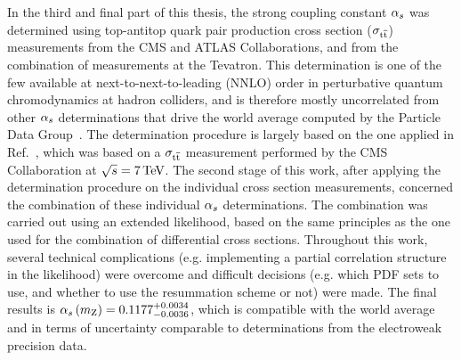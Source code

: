 In the third and final part of this thesis, the strong coupling constant $\alpha_s$ was determined using top-antitop quark pair production cross section ($\sigma_{\mathrm{t}\overline{\mathrm{t}}}$) measurements from the CMS and ATLAS Collaborations, and from the combination of measurements at the Tevatron.
% 
This determination is one of the few available at next-to-next-to-leading (NNLO) order in perturbative quantum chromodynamics at hadron colliders, and is therefore mostly uncorrelated from other $\alpha_s$ determinations that drive the world average computed by the Particle Data Group~\cite{pdg}.
% 
The determination procedure is largely based on the one applied in Ref.~\cite{Chatrchyan:2013haa}, which was based on a $\sigma_{\mathrm{t}\overline{\mathrm{t}}}$ measurement performed by the CMS Collaboration at $\sqrt{s}=7\,\text{TeV}$.
% 
The second stage of this work, after applying the determination procedure on the individual cross section measurements, concerned the combination of these individual $\alpha_s$ determinations.
% 
The combination was carried out using an extended likelihood, based on the same principles as the one used for the combination of differential cross sections.
% 
Throughout this work, several technical complications (e.g. implementing a partial correlation structure in the likelihood) were overcome and difficult decisions (e.g. which PDF sets to use, and whether to use the resummation scheme or not) were made.
% 
The final results is $\alpha_s \left( m_\mathrm{Z} \right)  = 0.1177^{+0.0034}_{-0.0036}$, which is compatible with the world average and in terms of uncertainty comparable to determinations from the electroweak precision data.

